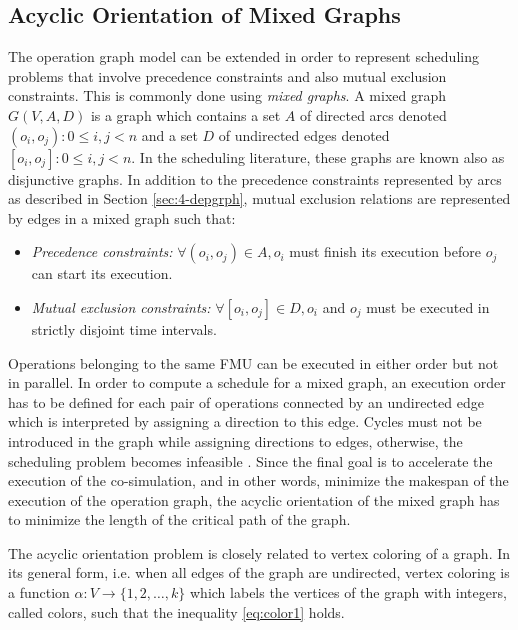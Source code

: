 \subsection{Acyclic Orientation of Mixed Graphs}

The operation graph model can be extended in order to represent scheduling problems that involve precedence constraints and also mutual exclusion constraints. This is commonly done using \textit{mixed graphs}. A mixed graph $G(V,A,D)$ is a graph which contains a set $A$ of directed arcs denoted $(o_i,o_j): 0 \leq i, j < n$ and a set $D$ of undirected edges denoted $[o_i,o_j]: 0 \leq i, j < n$. In the scheduling literature, these graphs are known also as disjunctive graphs. In addition to the precedence constraints represented by arcs as described in Section \ref{sec:4-depgrph}, mutual exclusion relations are represented by edges in a mixed graph such that: 
\begin{itemize}
\item \textit{Precedence constraints:} $\forall (o_i,o_j) \in A, o_i$ must finish its execution before $o_j$ can start its execution.  
\item \textit{Mutual exclusion constraints:} $\forall [o_i,o_j] \in D, o_i$ and $o_j$ must be executed in strictly disjoint time intervals.
\end{itemize}

Operations belonging to the same FMU can be executed in either order but not in parallel. In order to compute a schedule for a mixed graph, an execution order has to be defined for each pair of operations connected by an undirected edge which is interpreted by assigning a direction to this edge. Cycles must not be introduced in the graph while assigning directions to edges, otherwise, the scheduling problem becomes infeasible \cite{}. Since the final goal is to accelerate the execution of the co-simulation, and in other words, minimize the makespan of the execution of the operation graph, the acyclic orientation of the mixed graph has to minimize the length of the critical path of the graph.

The acyclic orientation problem is closely related to vertex coloring of a graph. In its general form, i.e. when all edges of the graph are undirected, vertex coloring is a function $\alpha: V \rightarrow \{1, 2, \ldots, k\}$ which labels the vertices of the graph with integers, called colors, such that the inequality \ref{eq:color1} holds.

